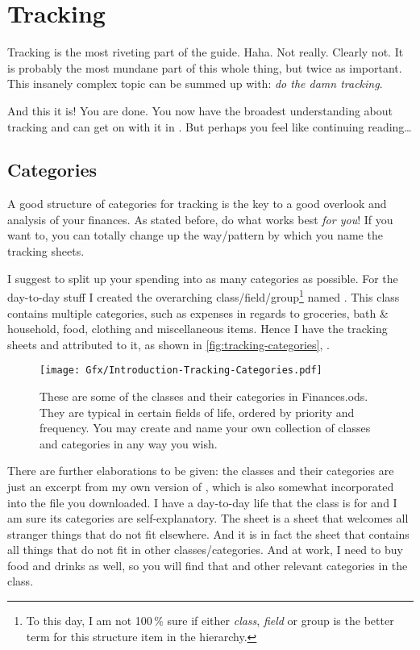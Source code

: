 \section{Tracking}
\label{sec:tracking}

Tracking is the most riveting part of the guide.
Haha.
Not really.
Clearly not.
It is probably the most mundane part of this whole thing, but twice as important.
This insanely complex topic can be summed up with: \emph{do the damn tracking}.

And this it is!
You are done.
You now have the broadest understanding about tracking and can get on with it in \tfn.
But perhaps you feel like continuing reading\ldots

\subsection{Categories}
\label{subsec:tracking-categories}

A good structure of categories for tracking is the key to a good overlook and analysis of your finances.
As stated before, do what works best \emph{for you}!
If you want to, you can totally change up the way/pattern by which you name the tracking sheets.

I suggest to split up your spending into as many categories as possible.
For the day-to-day stuff I created the overarching class/field/group\footnote{To this day, I am not 100\,\% sure if either \emph{class}, \emph{field} or group is the better term for this structure item in the hierarchy.} named .
This class contains multiple categories, such as expenses in regards to groceries, bath \& household, food, clothing and miscellaneous items.
Hence I have the tracking sheets  and  attributed to it, as shown in \autoref{fig:tracking-categories}, .

\begin{figure}[htp]
	\centering
	\texttt{[image: Gfx/Introduction-Tracking-Categories.pdf]}
	\caption[Tracking Categories]{These are some of the classes and their categories in Finances.ods.
	They are typical in certain fields of life, ordered by priority and frequency.
	You may create and name your own collection of classes and categories in any way you wish.%
	}
	\label{fig:tracking-categories}
\end{figure}

There are further elaborations to be given:
the classes and their categories are just an excerpt from my own version of \tfn, which is also somewhat incorporated into the file you downloaded.
I have a day-to-day life that the class  is for and I am sure its categories are self-explanatory.
The sheet  is a sheet that welcomes all stranger things that do not fit elsewhere.
And it is in fact the sheet that contains all  things that do not fit in other classes/categories.
And at work, I need to buy food and drinks as well, so you will find that and other relevant categories in the  class.

